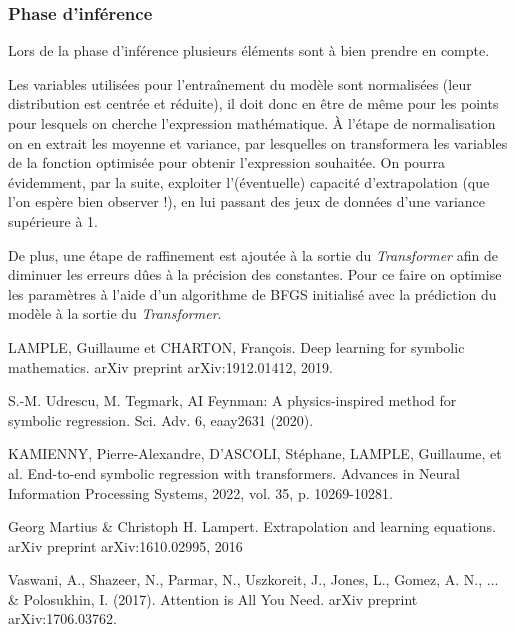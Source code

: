 \documentclass[a4paper,12pt]{article}
\begin{document}
\subsubsection{{\color{red}Phase d'inférence}}

Lors de la phase d'inférence plusieurs éléments sont à bien prendre en compte.

Les variables utilisées pour l'entraînement du modèle sont normalisées (leur distribution est centrée et réduite), il doit donc en être de même pour les points pour lesquels on cherche l'expression mathématique. À l'étape de normalisation on en extrait les moyenne et variance, par lesquelles on transformera les variables de la fonction optimisée pour obtenir l'expression souhaitée. On pourra évidemment, par la suite, exploiter l'(éventuelle) capacité d'extrapolation (que l'on espère bien observer !), en lui passant des jeux de données d'une variance supérieure à 1.

De plus, une étape de raffinement est ajoutée à la sortie du \emph{Transformer} afin de diminuer les erreurs dûes à la précision des constantes. Pour ce faire on optimise les paramètres à l'aide d'un algorithme de BFGS initialisé avec la prédiction du modèle à la sortie du \emph{Transformer}.

\newpage

\begin{thebibliography}{99}

LAMPLE, Guillaume et CHARTON, François. Deep learning for symbolic mathematics. arXiv preprint arXiv:1912.01412, 2019.

S.-M. Udrescu, M. Tegmark, AI Feynman: A physics-inspired method for symbolic regression.
Sci. Adv. 6, eaay2631 (2020).

KAMIENNY, Pierre-Alexandre, D'ASCOLI, Stéphane, LAMPLE, Guillaume, et al. End-to-end symbolic regression with transformers. Advances in Neural Information Processing Systems, 2022, vol. 35, p. 10269-10281.

Georg Martius & Christoph H. Lampert. Extrapolation and learning equations. arXiv preprint arXiv:1610.02995, 2016

Vaswani, A., Shazeer, N., Parmar, N., Uszkoreit, J., Jones, L., Gomez, A. N., ... & Polosukhin, I. (2017). Attention is All You Need. arXiv preprint arXiv:1706.03762.


\end{thebibliography}
\end{document}
